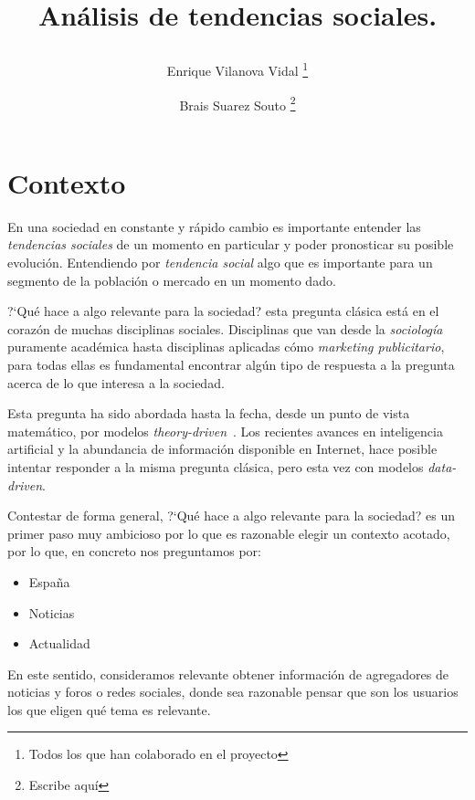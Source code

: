 \documentclass[a4paper,12pt]{article}
\title{%

An\'alisis de tendencias sociales.%
	
	\author{%
	Enrique Vilanova Vidal%
		\thanks{Todos los que han colaborado en el proyecto}
	\and Brais Suarez Souto
		\thanks{Escribe aqu\'i}
	}

}
\begin{document}
\maketitle
\thispagestyle{empty}
\clearpage
{} 
\newpage



\section[item_contexto]{Contexto}

En una sociedad en constante y  r\'apido cambio es importante entender las {\itshape tendencias sociales} de un momento en particular y poder pronosticar su posible evoluci\'on.
Entendiendo por  {\itshape tendencia social} algo que es importante para un segmento de la poblaci\'on o mercado en un momento dado.

?`Qu\'e hace a algo relevante para  la sociedad?  esta pregunta cl\'asica  est\'a en el coraz\'on de muchas disciplinas sociales. Disciplinas que van desde la {\itshape sociolog\'ia} puramente acad\'emica hasta disciplinas aplicadas c\'omo {\itshape marketing publicitario}, para todas ellas es fundamental encontrar alg\'un tipo de respuesta a la pregunta acerca de lo que interesa a la sociedad.

Esta pregunta ha sido abordada hasta la fecha, desde un punto de vista matem\'atico, por modelos {\itshape theory-driven}~\cite{td1,td2,td3}. Los recientes avances en inteligencia artificial y la abundancia de informaci\'on disponible en Internet, hace posible intentar responder a la misma pregunta cl\'asica, pero esta vez con modelos {\itshape data-driven}\cite{dd1}.

Contestar de forma general, ?`Qu\'e hace a algo relevante para  la sociedad? es un primer paso muy ambicioso por lo que es razonable elegir un contexto acotado, por lo que, en concreto nos preguntamos por:

\begin{itemize}

\item Espa\~na
\item Noticias
\item Actualidad

\end{itemize}

En este sentido, consideramos relevante obtener informaci\'on de agregadores de noticias y foros o redes sociales, donde sea razonable pensar que son los usuarios los que eligen qu\'e tema es relevante.
\end{document}
